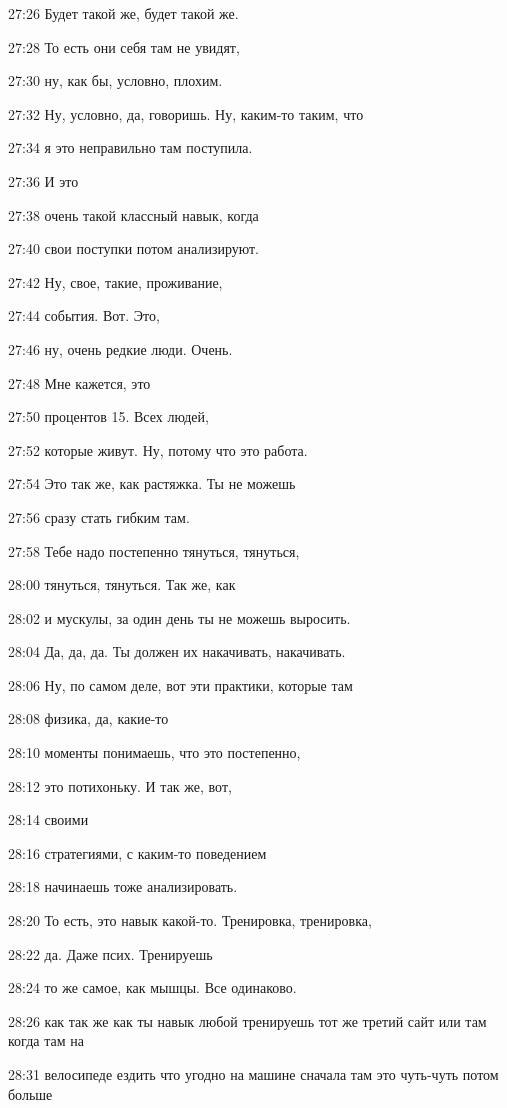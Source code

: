 27:26
Будет такой же, будет такой же.

27:28
То есть они себя там не увидят,

27:30
ну, как бы, условно, плохим.

27:32
Ну, условно, да, говоришь. Ну, каким-то таким, что

27:34
я это неправильно там поступила.

27:36
И это

27:38
очень такой классный навык, когда

27:40
свои поступки потом анализируют.

27:42
Ну, свое, такие, проживание,

27:44
события. Вот. Это,

27:46
ну, очень редкие люди. Очень.

27:48
Мне кажется, это

27:50
процентов 15. Всех людей,

27:52
которые живут. Ну, потому что это работа.

27:54
Это так же, как растяжка. Ты не можешь

27:56
сразу стать гибким там.

27:58
Тебе надо постепенно тянуться, тянуться,

28:00
тянуться, тянуться. Так же, как

28:02
и мускулы, за один день ты не можешь выросить.

28:04
Да, да, да. Ты должен их накачивать, накачивать.

28:06
Ну, по самом деле, вот эти практики, которые там

28:08
физика, да, какие-то

28:10
моменты понимаешь, что это постепенно,

28:12
это потихоньку. И так же, вот,

28:14
своими

28:16
стратегиями, с каким-то поведением

28:18
начинаешь тоже анализировать.

28:20
То есть, это навык какой-то. Тренировка, тренировка,

28:22
да. Даже псих. Тренируешь

28:24
то же самое, как мышцы. Все одинаково.

28:26
как так же как ты навык любой тренируешь тот же третий сайт или там когда там на

28:31
велосипеде ездить что угодно на машине сначала там это чуть-чуть потом больше

